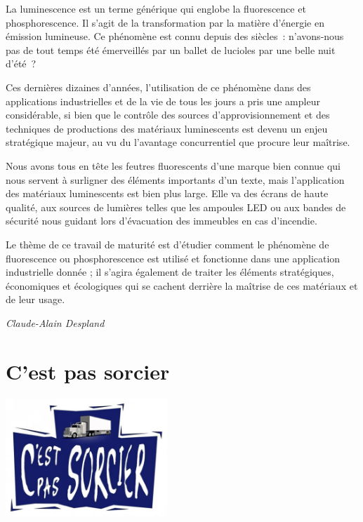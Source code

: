 \documentclass[
  10pt,
  french,
  a5paper,
  openany]{book}
\newenvironment{signature}{\begin{flushright}}{\end{flushright}}
\begin{document}

La luminescence est un terme générique qui englobe la fluorescence et phosphorescence. Il s'agit de la transformation par la matière d'énergie en émission lumineuse. Ce phénomène est connu depuis des siècles~: n'avons-nous pas de tout temps été émerveillés par un ballet de lucioles par une belle nuit d'été~?

Ces dernières dizaines d'années, l'utilisation de ce phénomène dans des applications industrielles et de la vie de tous les jours a pris une ampleur considérable, si bien que le contrôle des sources d'approvisionnement et des techniques de productions des matériaux luminescents est devenu un enjeu stratégique majeur, au vu du l'avantage concurrentiel que procure leur maîtrise.

Nous avons tous en tête les feutres fluorescents d'une marque bien connue qui nous servent à surligner des éléments importants d'un texte, mais l'application des matériaux luminescents est bien plus large. Elle va des écrans de haute qualité, aux sources de lumières telles que les ampoules LED ou aux bandes de sécurité nous guidant lors d'évacuation des immeubles en cas d'incendie.

\clearpage

Le thème de ce travail de maturité est d'étudier comment le phénomène de fluorescence ou phosphorescence est utilisé et fonctionne dans une application industrielle donnée ; il s'agira également de traiter les éléments stratégiques, économiques et écologiques qui se cachent derrière la maîtrise de ces matériaux et de leur usage.

\begin{signature}
\emph{Claude-Alain Despland}

\end{signature}

\hypertarget{cest-pas-sorcier}{%
\chapter{C'est pas sorcier}\label{cest-pas-sorcier}}

\begin{center}
\includegraphics[width=\textwidth,height=12em]{images/cest-pas-sorcier.jpg}

\end{center}
\end{document}
